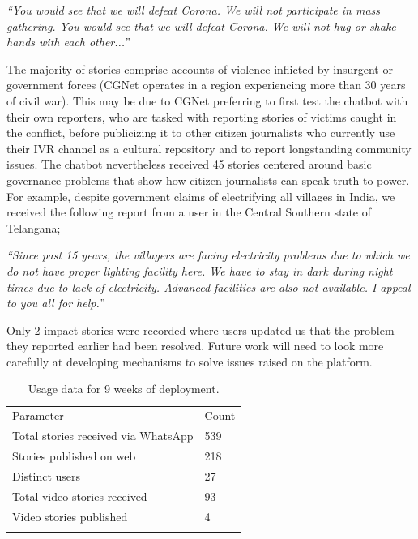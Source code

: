 \textit{``You would see that we will defeat Corona. We will not participate in mass gathering. You would see that we will defeat Corona. We will not hug or shake hands with each other...''
}

The majority of stories comprise accounts of violence inflicted by insurgent or government forces (CGNet operates in a region experiencing more than 30 years of civil war). This may be due to CGNet preferring to first test the chatbot with their own reporters, who are tasked with reporting stories of victims caught in the conflict, before publicizing it to other citizen journalists who currently use their IVR channel as a cultural repository and to report longstanding community issues. The chatbot nevertheless received 45 stories centered around basic governance problems that show how citizen journalists can speak truth to power. For example, despite government claims of electrifying all villages in India, we received the following report from a user in the Central Southern state of Telangana;

\textit{``Since past 15 years, the villagers are facing electricity problems due to which we do not have proper lighting facility here. We have to stay in dark during night times due to lack of electricity. Advanced facilities are also not available. I appeal to you all for help.''
}

Only 2 impact stories were recorded where users updated us that the problem they reported earlier had been resolved. Future work will need to look more carefully at developing mechanisms to solve issues raised on the platform.


\begin{table}[!htbp]
    \centering
    \caption{Usage data for 9 weeks of deployment.}
    \begin{tabular}{l l}
        \noalign{\smallskip}\midrule
        Parameter & Count \\
        \noalign{\smallskip}\midrule
        Total stories received via WhatsApp &	539  \\
        Stories published on web & 218	 \\
        Distinct users	& 27 \\
        Total video stories received & 93	\\
        Video stories published & 4	\\
        \noalign{\smallskip}\hline
    \end{tabular}
    
    \label{tab:usage_data}
\end{table} 


